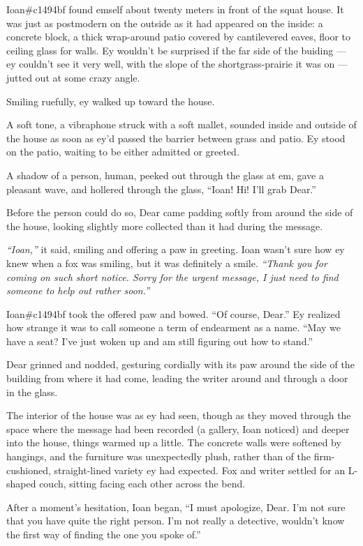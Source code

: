 Ioan\#c1494bf found emself about twenty meters in front of the squat house. It was just as postmodern on the outside as it had appeared on the inside: a concrete block, a thick wrap-around patio covered by cantilevered eaves, floor to ceiling glass for walls. Ey wouldn't be surprised if the far side of the buiding --- ey couldn't see it very well, with the slope of the shortgrass-prairie it was on --- jutted out at some crazy angle.

Smiling ruefully, ey walked up toward the house.

A soft tone, a vibraphone struck with a soft mallet, sounded inside and outside of the house as soon as ey'd passed the barrier between grass and patio. Ey stood on the patio, waiting to be either admitted or greeted.

A shadow of a person, human, peeked out through the glass at em, gave a pleasant wave, and hollered through the glass, ``Ioan! Hi! I'll grab Dear.''

Before the person could do so, Dear came padding softly from around the side of the house, looking slightly more collected than it had during the message.

\emph{``Ioan,''} it said, smiling and offering a paw in greeting. Ioan wasn't sure how ey knew when a fox was smiling, but it was definitely a smile. \emph{``Thank you for coming on such short notice. Sorry for the urgent message, I just need to find someone to help out rather soon.''}

Ioan\#c1494bf took the offered paw and bowed. ``Of course, Dear.'' Ey realized how strange it was to call someone a term of endearment as a name. ``May we have a seat? I've just woken up and am still figuring out how to stand.''

Dear grinned and nodded, gesturing cordially with its paw around the side of the building from where it had come, leading the writer around and through a door in the glass.

The interior of the house was as ey had seen, though as they moved through the space where the message had been recorded (a gallery, Ioan noticed) and deeper into the house, things warmed up a little. The concrete walls were softened by hangings, and the furniture was unexpectedly plush, rather than of the firm-cushioned, straight-lined variety ey had expected. Fox and writer settled for an L-shaped couch, sitting facing each other across the bend.

After a moment's hesitation, Ioan began, ``I must apologize, Dear. I'm not sure that you have quite the right person. I'm not really a detective, wouldn't know the first way of finding the one you spoke of.''

